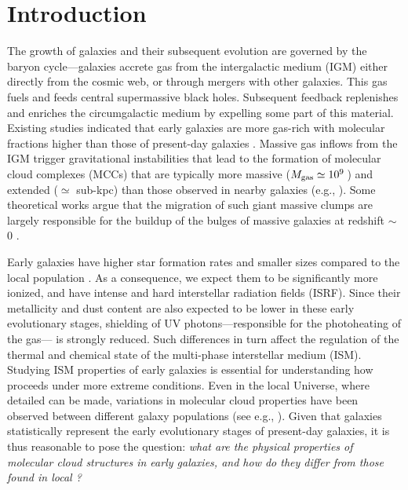 \IfFileExists{emulateapjlegacy.cls}{\documentclass[iop]{emulateapjlegacy}}{\documentclass[iop]{emulateapj}}
\newcommand{\DL}[1]{({\bf \color{dlcolor} DL: #1})}
\newcommand{\MM}[1]{({\bf \color{mmcolor} MM: #1})}
\begin{document}
\section{Introduction}
The growth of galaxies and their subsequent evolution are governed by the baryon cycle---galaxies accrete gas from the intergalactic medium (IGM) either directly from the cosmic web, or through mergers with other galaxies. This gas fuels \SF and feeds central
supermassive black holes. Subsequent feedback replenishes and enriches the circumgalactic medium by expelling some
part of this material.
Existing studies indicated that early galaxies are more gas-rich with molecular fractions higher than
those of present-day galaxies \citep[e.g.,][]{vandevoort11b, Decarli16a, Decarli17a}. 
Massive gas inflows from the IGM trigger gravitational instabilities that lead to the formation of molecular cloud complexes (MCCs)
that are typically more massive ($M_{\rm gas}\simeq 10^9$\,\Msun) and extended ($\simeq$ sub-kpc) than those observed in nearby galaxies (e.g., \citealt{Gabor13a, Hopkins14a, Inoue16a}).
Some theoretical works argue that the migration of such giant massive clumps are largely responsible for the buildup of the bulges of massive galaxies at redshift \z$\sim$\,0 \citep[e.g.,][]{Ceverino10a}.

Early galaxies have higher star formation rates \citep[SFR; ][]{Behroozi13b, Sparre15a, Maiolino15a, Dunlop17a} and smaller sizes \citep[e.g.,][]{Bouwens11a, Ono13a} compared to the local population \citep[see also a review by][]{Stark16a}.
%
As a consequence, we expect them to be significantly more ionized, and have intense and hard interstellar radiation fields (ISRF). Since their metallicity and dust content are also expected to be lower in these early evolutionary stages, shielding of UV photons---responsible for the photoheating of the gas---  is strongly reduced. Such differences in turn affect the regulation of the thermal and chemical state of the multi-phase interstellar medium (ISM). Studying ISM properties of early galaxies is essential for understanding how \SF proceeds under more extreme conditions.
%
Even in the local Universe, where detailed \obs can be made, variations in molecular cloud
properties have been observed between different galaxy populations (see e.g., \citealt{Hughes10a, Hughes13b}).  Given that \highz galaxies statistically represent the early evolutionary stages of present-day galaxies, it is thus reasonable to pose the question: 
{\it what are the physical properties of
molecular cloud structures in early galaxies, and how do they differ from those found in local \galpop?}
%
\end{document}

